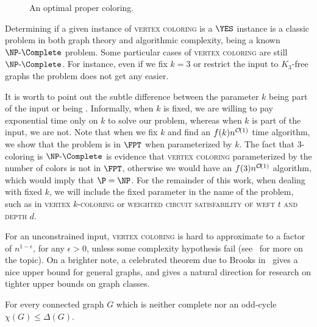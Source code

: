 \begin{figure}[!htb]
    \centering
    \caption{An optimal proper coloring.}
    \label{fig:prop_color}
\end{figure}

Determining if a given instance of \textsc{vertex coloring} is a $\YES$ instance is a classic problem in both graph theory and algorithmic complexity, being a known $\NPc$ problem.
Some particular cases of \textsc{vertex coloring} are still $\NPc$.
For instance, even if we fix $k=3$ or restrict the input to $K_3$-free graphs the problem does not get any easier.

It is worth to point out the subtle difference between the parameter $k$ being part of the input or being .
Informally, when $k$ is fixed, we are willing to pay exponential time only on $k$ to solve our problem, whereas when $k$ is part of the input, we are not.
Note that when we fix $k$ and find an $f(k)n^{\mathcal{O}\!\left(1\right)}$ time algorithm, we show that the problem is in $\FPT$ when parameterized by $k$.
The fact that $3$-coloring is $\NPc$ is evidence that \textsc{vertex coloring} parameterized by the number of colors is not in $\FPT$, otherwise we would have an $f(3)n^{\mathcal{O}\!\left(1\right)}$ algorithm, which would imply that $\P = \NP$. 
For the remainder of this work, when dealing with fixed $k$, we will include the fixed parameter in the name of the problem, such as in \textsc{vertex $k$-coloring} or \textsc{weighted circuit satisfability of weft $t$ and depth $d$}.

For an unconstrained input, \textsc{vertex coloring} is hard to approximate to a factor of $n^{1-\epsilon}$, for any $\epsilon > 0$, unless some complexity hypothesis fail (see~\citep{color_zpp} for more on the topic).
On a brighter note, a celebrated theorem due to Brooks in~\citep{brooks_theorem} gives a nice upper bound for general graphs, and gives a natural direction for research on tighter upper bounds on graph classes.

\begin{theorem*}
    For every connected graph $G$ which is neither complete nor an odd-cycle $\chi(G) \leq \Delta(G)$.
\end{theorem*}

